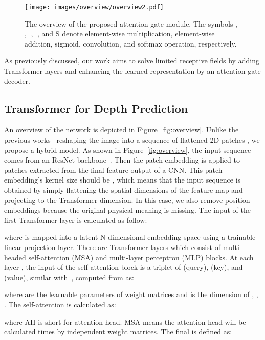 \documentclass[10pt,twocolumn,letterpaper]{article}
\begin{document}
\begin{figure*}[t] \small
\centering
\texttt{[image: images/overview/overview2.pdf]}
\caption{The overview of the proposed attention gate module. The symbols , , \textcircled{}, \textcircled{}, and \textcircled{\tiny{S}} denote element-wise multiplication, element-wise addition, sigmoid, convolution, and softmax operation, respectively.
}
\label{fig:agdeconder}
\vspace{-0.4cm}
\end{figure*}


As previously discussed, our work aims to solve limited receptive fields by adding Transformer layers and enhancing the learned representation by an attention gate decoder. 
\subsection{Transformer for Depth Prediction}

An overview of the network is depicted in Figure~\ref{fig:overview}. Unlike the previous works~\cite{zheng2020rethinking,chen2021transunet, dosovitskiy2020image} reshaping the image  into a sequence of flattened 2D patches , we propose a hybrid model. As shown in Figure~\ref{fig:overview}, the input sequence comes from an ResNet backbone~\cite{he2016deep}. 
Then the patch embedding is applied to patches extracted from the final feature output of a CNN. This patch embedding's kernel size should be , which means that the input sequence is obtained by simply flattening the spatial dimensions of the feature map and projecting to the Transformer dimension. In this case, we also remove position embeddings because the original physical meaning is missing. The input of the first Transformer layer is calculated as follow:

where  is mapped into a latent N-dimensional embedding space using a trainable linear projection layer. There are  Transformer layers which consist of multi-headed self-attention (MSA) and multi-layer perceptron (MLP) blocks. At each layer , the input of the self-attention block is a triplet of  (query),  (key), and  (value), similar with~\cite{vaswani2017attention}, computed from  as:

where  are the learnable parameters of weight matrices and  is the dimension of , , . The self-attention is calculated as:

where AH is short for attention head.
MSA means the attention head will be calculated  times by independent weight matrices. The final  is defined as:
\end{document}
